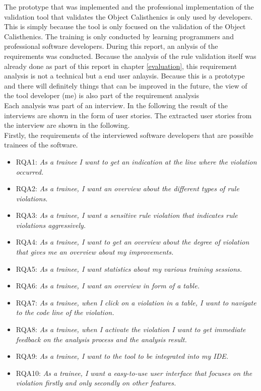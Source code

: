 The prototype that was implemented and the professional implementation of the validation tool that validates the Object Calisthenics is only used by developers. This is simply because the tool is only focused on the validation of the Object Calisthenics. The training is only conducted by learning programmers and professional software developers. During this report, an anlysis of the requirements was conducted. Because the analysis of the rule validation itself was already done as part of this report in chapter \ref{evaluation}, this requirement analysis is not a technical but a end user anlaysis. Because this is a prototype and there will definitely things that can be improved in the future, the view of the tool developer (me) is also part of the requirement analysis
\\

Each analysis was part of an interview. In the following the result of the interviews are shown in the form of user stories. The extracted user stories from the interview are shown in the following.
\\

Firstly, the requirements of the interviewed software developers that are possible trainees of the software. 
\begin{itemize}
  \item RQA1: \textit{As a trainee I want to get an indication at the line where the violation occurred.}
  \item RQA2: \textit{As a trainee, I want an overview about the different types of rule violations.}
  \item RQA3: \textit{As a trainee, I want a sensitive rule violation that indicates rule violations aggressively.}
  \item RQA4: \textit{As a trainee, I want to get an overview about the degree of violation that gives me an overview about my improvements.}
  \item RQA5: \textit{As a trainee, I want statistics about my various training sessions.}
  \item RQA6: \textit{As a trainee, I want an overview in form of a table.}
  \item RQA7: \textit{As a trainee, when I click on a violation in a table, I want to navigate to the code line of the violation.}
  \item RQA8: \textit{As a trainee, when I activate the violation I want to get immediate feedback on the analysis process and the analysis result.}
  \item RQA9: \textit{As a trainee, I want to the tool to be integrated into my \acf{IDE}.}
  \item RQA10: \textit{As a trainee, I want a easy-to-use user interface that focuses on the violation firstly and only secondly on other features.}
\end{itemize}

